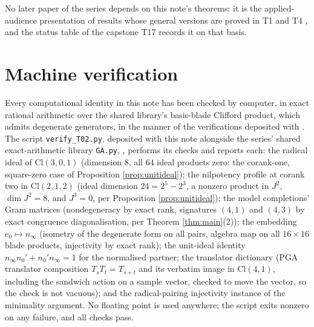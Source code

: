 \documentclass[11pt]{article}
\theoremstyle{definition}
\newcommand{\Cl}{\mathrm{Cl}}
\newcommand{\nO}{n_0}
\newcommand{\nInf}{n_\infty}
\begin{document}
No later paper of the series depends on this note's theorems: it is the applied-audience presentation of results whose general versions are proved in T1 \cite{ButlerT1} and T4 \cite{ButlerT4}, and the status table of the capstone T17 \cite{ButlerT17} records it on that basis.

\section{Machine verification}\label{sec:verification}

Every computational identity in this note has been checked by computer, in exact rational arithmetic over the shared library's basis-blade Clifford product, which admits degenerate generators, in the manner of the verifications deposited with \cite{ButlerT1, ButlerT4}. The script \texttt{verify\_T02.py}, deposited with this note alongside the series' shared exact-arithmetic library \texttt{GA.py}, \cite{ButlerVerifyT02}, performs its checks and reports each: the radical ideal of $\Cl(3,0,1)$ (dimension $8$, all $64$ ideal products zero: the corank-one, square-zero case of Proposition \ref{prop:unitideal}); the nilpotency profile at corank two in $\Cl(2,1,2)$ (ideal dimension $24 = 2^5 - 2^3$, a nonzero product in $J^2$, $\dim J^2 = 8$, and $J^3 = 0$, per Proposition \ref{prop:unitideal}); the model completions' Gram matrices (nondegeneracy by exact rank, signatures $(4,1)$ and $(4,3)$ by exact congruence diagonalisation, per Theorem \ref{thm:main}(2)); the embedding $e_0 \mapsto \nInf$ (isometry of the degenerate form on all pairs, algebra map on all $16 \times 16$ blade products, injectivity by exact rank); the unit-ideal identity $\nInf \nO' + \nO' \nInf = 1$ for the normalised partner; the translator dictionary (PGA translator composition $T_s T_t = T_{s+t}$ and its verbatim image in $\Cl(4,1)$, including the sandwich action on a sample vector, checked to move the vector, so the check is not vacuous); and the radical-pairing injectivity instance of the minimality argument. No floating point is used anywhere; the script exits nonzero on any failure, and all checks pass.
\end{document}
